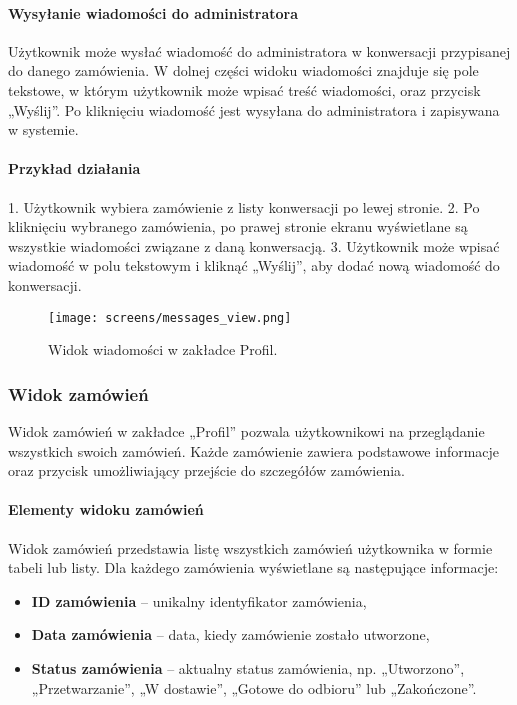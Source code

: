 \documentclass[12pt,a4paper,oneside]{article}
\theoremstyle{definition}
\numberwithin{equation}{section}
\begin{document}
\paragraph{Wysyłanie wiadomości do administratora}
Użytkownik może wysłać wiadomość do administratora w konwersacji przypisanej do danego zamówienia. W dolnej części widoku wiadomości znajduje się pole tekstowe, w którym użytkownik może wpisać treść wiadomości, oraz przycisk „Wyślij”. Po kliknięciu wiadomość jest wysyłana do administratora i zapisywana w systemie.

\paragraph{Przykład działania}
1. Użytkownik wybiera zamówienie z listy konwersacji po lewej stronie.
2. Po kliknięciu wybranego zamówienia, po prawej stronie ekranu wyświetlane są wszystkie wiadomości związane z daną konwersacją.
3. Użytkownik może wpisać wiadomość w polu tekstowym i kliknąć „Wyślij”, aby dodać nową wiadomość do konwersacji.

\begin{figure}[h!]
    \centering
    \texttt{[image: screens/messages\_view.png]}
    \caption{Widok wiadomości w zakładce Profil.}
    \label{fig:messages_view}
\end{figure}



\subsubsection{Widok zamówień}
Widok zamówień w zakładce „Profil” pozwala użytkownikowi na przeglądanie wszystkich swoich zamówień. Każde zamówienie zawiera podstawowe informacje oraz przycisk umożliwiający przejście do szczegółów zamówienia.

\paragraph{Elementy widoku zamówień}
Widok zamówień przedstawia listę wszystkich zamówień użytkownika w formie tabeli lub listy. Dla każdego zamówienia wyświetlane są następujące informacje:
\begin{itemize}
    \item \textbf{ID zamówienia} – unikalny identyfikator zamówienia,
    \item \textbf{Data zamówienia} – data, kiedy zamówienie zostało utworzone,
    \item \textbf{Status zamówienia} – aktualny status zamówienia, np. „Utworzono”, „Przetwarzanie”, „W dostawie”, „Gotowe do odbioru” lub „Zakończone”.
\end{itemize}
\end{document}
